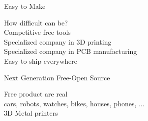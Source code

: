 \documentclass[compress,red]{beamer}
\begin{document}

\begin{frame}{Easy to Make}
  \Large
  \begin{center}
    How difficult can be? \\
    \vskip 1cm
    Competitive free tools \\
    \vskip 1cm
    Specialized company in 3D printing \\
    \vskip 1cm
    Specialized company in PCB manufacturing \\
    \vskip 1cm
    Easy to ship everywhere
 \end{center}

\end{frame}


\begin{frame}{Next Generation Free-Open Source}
  \Large
  \begin{center}
    Free product are real \\
    \vskip 1cm
    cars, robots, watches, bikes, houses, phones, ... \\
    \vskip 1cm
    3D Metal printers \\
  \end{center}

\end{frame}

\end{document}

